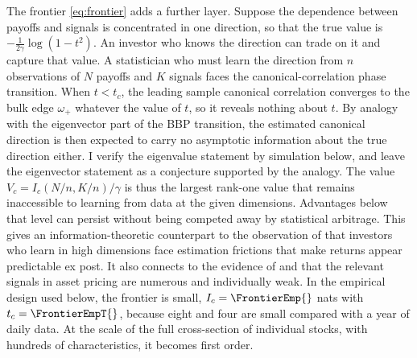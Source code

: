 The frontier \eqref{eq:frontier} adds a further layer. Suppose the dependence between payoffs and signals is concentrated in one direction, so that the true value is $-\tfrac1{2\gamma}\log(1-t^2)$. An investor who knows the direction can trade on it and capture that value. A statistician who must learn the direction from $n$ observations of $N$ payoffs and $K$ signals faces the canonical-correlation phase transition. When $t<t_c$, the leading sample canonical correlation converges to the bulk edge $\omega_+$ whatever the value of $t$, so it reveals nothing about $t$. By analogy with the eigenvector part of the BBP transition, the estimated canonical direction is then expected to carry no asymptotic information about the true direction either. I verify the eigenvalue statement by simulation below, and leave the eigenvector statement as a conjecture supported by the analogy. The value $V_c=I_c(N/n,K/n)/\gamma$ is thus the largest rank-one value that remains inaccessible to learning from data at the given dimensions. Advantages below that level can persist without being competed away by statistical arbitrage. This gives an information-theoretic counterpart to the observation of \citet{martin2022market} that investors who learn in high dimensions face estimation frictions that make returns appear predictable ex post. It also connects to the evidence of \citet{kelly2024virtue} and \citet{kozak2020shrinking} that the relevant signals in asset pricing are numerous and individually weak. In the empirical design used below, the frontier is small, $I_c=\FrontierEmp{}$ nats with $t_c=\FrontierEmpT{}$, because eight and four are small compared with a year of daily data. At the scale of the full cross-section of individual stocks, with hundreds of characteristics, it becomes first order.
